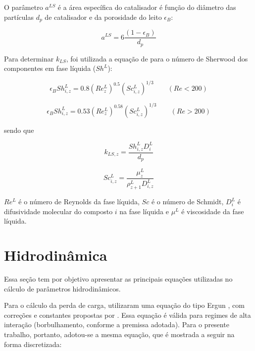 O parâmetro $a^{LS}$ é a área específica do catalisador é função do diâmetro
das partículas $d_p$ de catalisador e da porosidade do leito $\epsilon_B$:

\begin{equation}
a^{LS} = 6 \dfrac{(1-\epsilon_B)}{d_p}
\label{eq:aLS}
\end{equation}


Para determinar $k_{LS}$, foi utilizada a equação de 
para o número de Sherwood dos componentes em fase líquida ($Sh^L$):

\begin{equation}
\epsilon_BSh^L_{i,z} = 0.8(Re^L_z)^{0.5}(Sc^L_{i,z})^{1/3} \qquad (Re<200)
\label{eq:Sh1}
\end{equation}

\begin{equation}
\epsilon_BSh^L_{i,z} = 0.53(Re^L_z)^{0.58}(Sc^L_{i,z})^{1/3} \qquad (Re>200)
\label{eq:Sh2}
\end{equation}

sendo que

\begin{equation}
k_{LS,z} = \dfrac{Sh^L_{i,z}D^L_{i}}{d_p}
\label{eq:kLS}
\end{equation}

\begin{equation} 
Sc^L_{i,z} = \dfrac{\mu^L_{z}}{\rho^L_{z+1}D^L_{i,z}}
\label{eq:Sc}
\end{equation}

$Re^L$ é o número de Reynolds da fase líquida, $Sc$ é o número de Schmidt,
$D^L_{i}$ é difusividade molecular do composto $i$ na fase líquida e $\mu^L$ é
viscosidade da fase líquida.


\section{Hidrodinâmica} \label{sec:hidrodinamica3}

Essa seção tem por objetivo apresentar as principais equações utilizadas no
cálculo de parâmetros hidrodinâmicos.

Para o cálculo da perda de carga,  utilizaram uma equação
do tipo Ergun , com correções e constantes propostas
por . Essa equação é válida para regimes de alta
interação (borbulhamento, conforme a premissa adotada). Para o presente
trabalho, portanto, adotou-se a mesma equação, que é mostrada a seguir na forma
discretizada:

